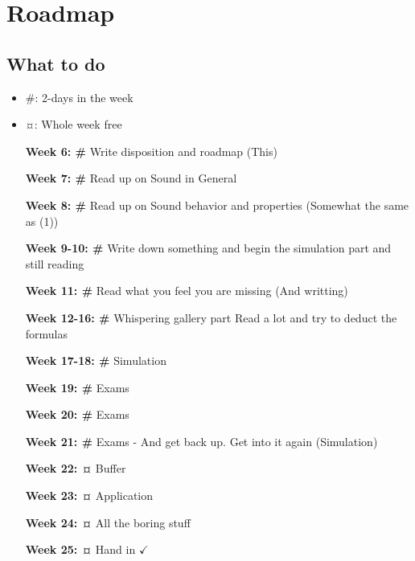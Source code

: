 \documentclass[../main.tex]{subfiles}
\begin{document}
\section{Roadmap}

\subsection{What to do}

\begin{itemize}
    \item \#: 2-days in the week
    \item ¤: Whole week free
\end{itemize}

\begin{itemize}
    \item [\textbf{Week 6: \#}] Write disposition and roadmap (This)
    \item [\textbf{Week 7: \#}] Read up on Sound in General 
    \item [\textbf{Week 8: \#}] Read up on Sound behavior and properties (Somewhat the same as (1)) 
    \item [\textbf{Week 9-10: \#}] Write down something and begin the simulation part and still reading
    \item [\textbf{Week 11: \#}] Read what you feel you are missing (And writting) 
    \item [\textbf{Week 12-16: \#}] Whispering gallery part Read a lot and try to deduct the formulas
    \item [\textbf{Week 17-18: \#}] Simulation
    \item [\textbf{Week 19: \#}] Exams
    \item [\textbf{Week 20: \#}] Exams
    \item [\textbf{Week 21: \#}] Exams - And get back up. Get into it again (Simulation)
    \item [\textbf{Week 22: ¤}] Buffer
    \item [\textbf{Week 23: ¤}] Application
    \item [\textbf{Week 24: ¤}] All the boring stuff
    \item [\textbf{Week 25: ¤}] Hand in $\checkmark$
\end{itemize}
\end{document}
